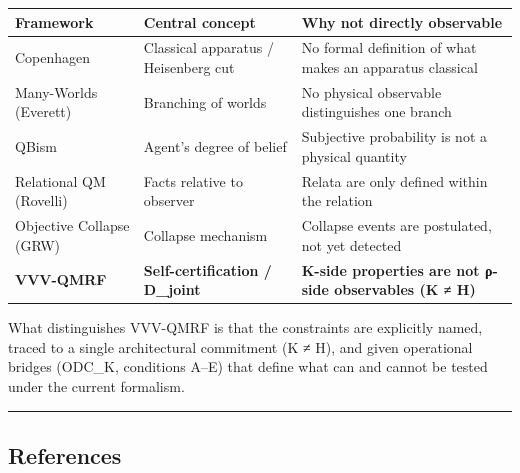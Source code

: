 \documentclass[
  11pt,
]{article}
\newcounter{none} %
\begin{document}
{\def\LTcaptype{none} %
\begin{longtable}[]{@{}
  >{\raggedright\arraybackslash}p{}
  >{\raggedright\arraybackslash}p{}
  >{\raggedright\arraybackslash}p{}@{}}
\toprule\noalign{}
\begin{minipage}[b]{\linewidth}\raggedright
Framework
\end{minipage} & \begin{minipage}[b]{\linewidth}\raggedright
Central concept
\end{minipage} & \begin{minipage}[b]{\linewidth}\raggedright
Why not directly observable
\end{minipage} \\
\midrule\noalign{}
\endhead
\bottomrule\noalign{}
\endlastfoot
Copenhagen & Classical apparatus / Heisenberg cut & No formal definition
of what makes an apparatus classical \\
Many-Worlds (Everett) & Branching of worlds & No physical observable
distinguishes one branch \\
QBism & Agent's degree of belief & Subjective probability is not a
physical quantity \\
Relational QM (Rovelli) & Facts relative to observer & Relata are only
defined within the relation \\
Objective Collapse (GRW) & Collapse mechanism & Collapse events are
postulated, not yet detected \\
\textbf{VVV-QMRF} & \textbf{Self-certification / D\_joint} &
\textbf{K-side properties are not ρ-side observables (K ≠ H)} \\
\end{longtable}
}

What distinguishes VVV-QMRF is that the constraints are explicitly
named, traced to a single architectural commitment (K ≠ H), and given
operational bridges (ODC\_K, conditions A--E) that define what can and
cannot be tested under the current formalism.

\begin{center}\rule{0.5\linewidth}{0.5pt}\end{center}

\subsection{References}\label{references}
\end{document}
